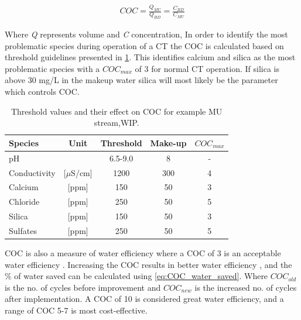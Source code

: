 \begin{ceqn}
    \begin{align}
    \label{eq:COC_eq}%
       COC = \frac{ Q_{MU}}{ Q_{BD}}= \frac{ C_{BD}}{C_{MU}}
    \end{align}
\end{ceqn}
Where \textit{Q} represents volume and \textit{C} concentration, %
In order to identify the most problematic species during operation of a CT the COC is calculated based on threshold guidelines presented in \cref{Tab:CT_water_threshhold}. 
This identifies calcium and silica as the most problematic species with a $COC_{max}$ of 3 for normal CT operation. 
If silica is above 30 mg/L in the makeup water silica will most likely be the parameter which controls COC. \citep{IntroductionCoolingTower2014}

\begin{table}[h]
\centering
\caption{Threshold values and their effect on COC for example MU stream,WIP. } 
\begin{tabular}{lc|ccc}
Species            & Unit & Threshold  & Make-up & $COC_{max}$ \\ \hline
pH                  &    & 6.5-9.0   & 8 & - \\
Conductivity &[$\mu$S/cm]   & 1200     &  300   &   4   \\
Calcium   &[ppm]               & 150   &  50  &3\\
Chloride &[ppm]          & 250       & 50  &5     \\
Silica   & [ppm]              & 150       & 50    &3   \\   
Sulfates  &  [ppm]            & 250       & 50      &5 \\

\end{tabular}
\label{Tab:CT_water_threshhold}
\end{table}


COC is also a measure of water efficiency where a COC of 3 is an acceptable water efficiency \citep{IntroductionCoolingTower2014}. 
Increasing the COC results in better water efficiency  \citep{IntroductionCoolingTower2014} \citep{PracticalApproachWater2007}, and the \% of water saved can be calculated using \cref{eq:COC_water_saved}.  
Where $COC_{old}$ is the no. of cycles before improvement and $COC_{new}$ is the increased no. of cycles after implementation. \citep{PracticalApproachWater2007}
A COC of 10 is considered great water efficiency, and a range of COC 5-7 is most cost-effective. \citep{IntroductionCoolingTower2014}


